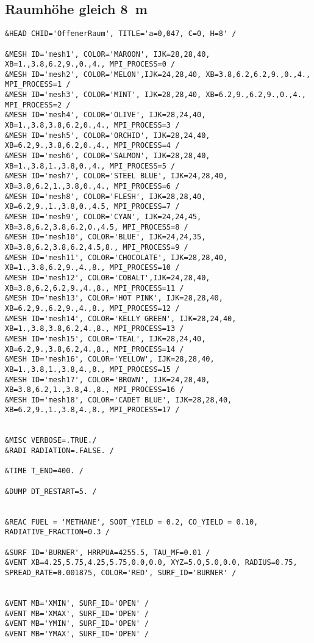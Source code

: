 \subsection*{Raumhöhe gleich 8~m}
\begin{lstlisting}[emptylines=0,basicstyle=\tiny]
&HEAD CHID='OffenerRaum', TITLE='a=0,047, C=0, H=8' /

&MESH ID='mesh1', COLOR='MAROON', IJK=28,28,40, XB=1.,3.8,6.2,9.,0.,4., MPI_PROCESS=0 /
&MESH ID='mesh2', COLOR='MELON',IJK=24,28,40, XB=3.8,6.2,6.2,9.,0.,4., MPI_PROCESS=1 /
&MESH ID='mesh3', COLOR='MINT', IJK=28,28,40, XB=6.2,9.,6.2,9.,0.,4., MPI_PROCESS=2 /
&MESH ID='mesh4', COLOR='OLIVE', IJK=28,24,40, XB=1.,3.8,3.8,6.2,0.,4., MPI_PROCESS=3 /
&MESH ID='mesh5', COLOR='ORCHID', IJK=28,24,40, XB=6.2,9.,3.8,6.2,0.,4., MPI_PROCESS=4 /
&MESH ID='mesh6', COLOR='SALMON', IJK=28,28,40, XB=1.,3.8,1.,3.8,0.,4., MPI_PROCESS=5 /
&MESH ID='mesh7', COLOR='STEEL BLUE', IJK=24,28,40, XB=3.8,6.2,1.,3.8,0.,4., MPI_PROCESS=6 /
&MESH ID='mesh8', COLOR='FLESH', IJK=28,28,40, XB=6.2,9.,1.,3.8,0.,4.5, MPI_PROCESS=7 /
&MESH ID='mesh9', COLOR='CYAN', IJK=24,24,45, XB=3.8,6.2,3.8,6.2,0.,4.5, MPI_PROCESS=8 /
&MESH ID='mesh10', COLOR='BLUE', IJK=24,24,35, XB=3.8,6.2,3.8,6.2,4.5,8., MPI_PROCESS=9 /
&MESH ID='mesh11', COLOR='CHOCOLATE', IJK=28,28,40, XB=1.,3.8,6.2,9.,4.,8., MPI_PROCESS=10 /
&MESH ID='mesh12', COLOR='COBALT',IJK=24,28,40, XB=3.8,6.2,6.2,9.,4.,8., MPI_PROCESS=11 /
&MESH ID='mesh13', COLOR='HOT PINK', IJK=28,28,40, XB=6.2,9.,6.2,9.,4.,8., MPI_PROCESS=12 /
&MESH ID='mesh14', COLOR='KELLY GREEN', IJK=28,24,40, XB=1.,3.8,3.8,6.2,4.,8., MPI_PROCESS=13 /
&MESH ID='mesh15', COLOR='TEAL', IJK=28,24,40, XB=6.2,9.,3.8,6.2,4.,8., MPI_PROCESS=14 /
&MESH ID='mesh16', COLOR='YELLOW', IJK=28,28,40, XB=1.,3.8,1.,3.8,4.,8., MPI_PROCESS=15 /
&MESH ID='mesh17', COLOR='BROWN', IJK=24,28,40, XB=3.8,6.2,1.,3.8,4.,8., MPI_PROCESS=16 /
&MESH ID='mesh18', COLOR='CADET BLUE', IJK=28,28,40, XB=6.2,9.,1.,3.8,4.,8., MPI_PROCESS=17 /


&MISC VERBOSE=.TRUE./
&RADI RADIATION=.FALSE. /

&TIME T_END=400. /

&DUMP DT_RESTART=5. /


&REAC FUEL = 'METHANE', SOOT_YIELD = 0.2, CO_YIELD = 0.10, RADIATIVE_FRACTION=0.3 /

&SURF ID='BURNER', HRRPUA=4255.5, TAU_MF=0.01 /
&VENT XB=4.25,5.75,4.25,5.75,0.0,0.0, XYZ=5.0,5.0,0.0, RADIUS=0.75, SPREAD_RATE=0.001875, COLOR='RED', SURF_ID='BURNER' /


&VENT MB='XMIN', SURF_ID='OPEN' /  
&VENT MB='XMAX', SURF_ID='OPEN' /  
&VENT MB='YMIN', SURF_ID='OPEN' /  
&VENT MB='YMAX', SURF_ID='OPEN' / 


\end{lstlisting}
